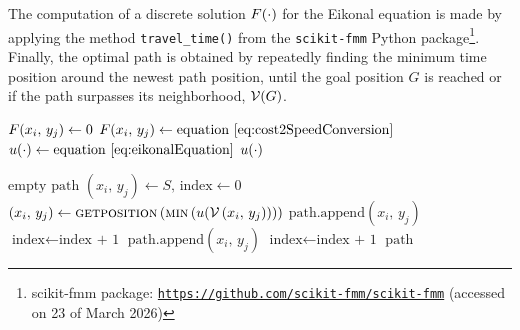 The computation of a discrete solution $F(\cdot)$ for the Eikonal equation is made by applying the method \texttt{travel\_time()} from the \texttt{scikit-fmm} Python package\footnote{scikit-fmm package: \texttt{\url{https://github.com/scikit-fmm/scikit-fmm}} (accessed on 23 of March 2026)}. Finally, the optimal path is obtained by repeatedly finding the minimum time position around the newest path position, until the goal position $G$ is reached or if the path surpasses its neighborhood, $\mathcal{V}(G)$.

\begin{algorithm}[H]
	\caption{\footnotesize \textsc{POTENTIALFLOW}}
	\label{alg:speedMapGeneration}
	\centering
	\footnotesize
	\begin{algorithmic}[1]
			\State $F(x_i,\,y_j) \gets 0$ 
		\Else
			\State $F(x_i,\,y_j) \gets \text{equation \eqref{eq:cost2SpeedConversion}}$ 
		\EndIf
	\EndFor
	\State $u(\cdot) \gets \text{equation \eqref{eq:eikonalEquation}}$ 
	\State \Return $u(\cdot)$
	\EndFunction
	\end{algorithmic}
\end{algorithm}

\begin{algorithm}[H]
	\caption{\footnotesize \textsc{OPTIMALPATH}}
	\label{alg:optimalPathGeneration}
	\centering
	\footnotesize
	\begin{algorithmic}[1]
		\State \Return $\text{empty path}$ 
	\EndIf
	\State $\left( x_i,\,y_j \right) \gets S,\, \text{index} \gets 0$ 
		\State $\left( x_i,\,y_j \right) \gets \textsc{getposition} \left( \textsc{min} \left( u( \mathcal{V}\left( x_i,\,y_j \right))\right)\right)$  
		\State $\text{path.append}\left( x_i,\,y_j \right)$ 
		\State $\text{index} \gets \text{index + 1}$
	\EndWhile
		\State $\text{path.append}\left( x_i,\,y_j \right)$ 
		\State $\text{index} \gets \text{index + 1}$
	\EndWhile
	\State \Return $\text{path}$
	\EndFunction
	\end{algorithmic}
\end{algorithm}

